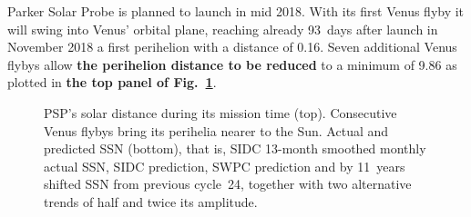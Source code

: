 Parker Solar Probe is planned to launch in mid 2018. With its first Venus flyby it will swing into Venus' orbital plane, reaching already 93~days after launch in November 2018 a first perihelion with a distance of \SI{0.16}{\au}. Seven additional Venus flybys allow \textbf{the perihelion distance to be reduced} to a minimum of \SI{9.86}{\Rs} \citep{Fox2015} as plotted in \textbf{the top panel of Fig.~\ref{fig:SPP_orbit_predicted_SSN_overview_f_plot}}.
\begin{figure}
	\caption{PSP's solar distance during its mission time (top). Consecutive Venus flybys bring its perihelia nearer to the Sun. Actual and predicted SSN (bottom), that is, SIDC 13-month smoothed monthly actual SSN, SIDC prediction, SWPC prediction and by 11~years shifted SSN from previous cycle~24, together with two alternative trends of half and twice its amplitude.}
	\label{fig:SPP_orbit_predicted_SSN_overview_f_plot}
\end{figure}

